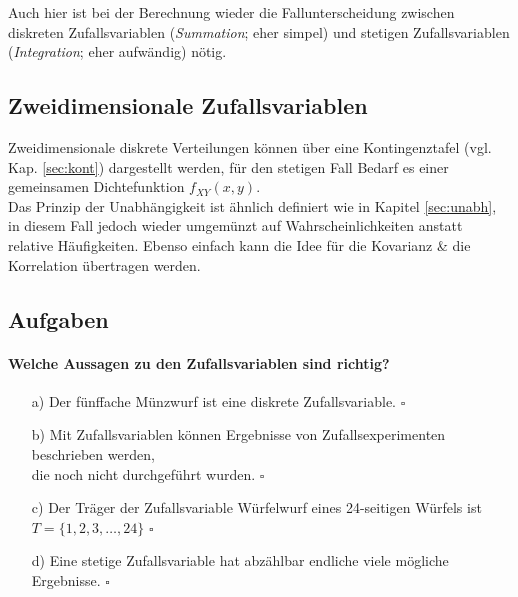 \documentclass[a4paper]{article}
\newcommand\dangersign[1][2ex]{%
  \renewcommand\stacktype{L}%
  \scaleto{\stackon[1.3pt]{\color{red}$\triangle$}{\tiny !}}{#1}%
}
\begin{document}
\noindent \dangersign[3ex] Auch hier ist bei der Berechnung wieder die Fallunterscheidung zwischen diskreten Zufallsvariablen (\textit{Summation}; eher simpel) und stetigen Zufallsvariablen (\textit{Integration}; eher aufwändig) nötig.

\subsection{Zweidimensionale Zufallsvariablen}\label{sec:2zv}

Zweidimensionale diskrete Verteilungen können über eine Kontingenztafel (vgl. Kap. \ref{sec:kont}) dargestellt werden, für den stetigen Fall Bedarf es einer gemeinsamen Dichtefunktion $f_{XY}(x,y)$.\\
Das Prinzip der Unabhängigkeit ist ähnlich definiert wie in Kapitel \ref{sec:unabh}, in diesem Fall jedoch wieder umgemünzt auf Wahrscheinlichkeiten anstatt relative Häufigkeiten. Ebenso einfach kann die Idee für die Kovarianz \& die Korrelation übertragen werden.

\clearpage

\subsection{Aufgaben}
\paragraph{Welche Aussagen zu den Zufallsvariablen sind richtig?}
\begin{itemize}
    \item[a)] Der fünffache Münzwurf ist eine diskrete Zufallsvariable. \hfill $\square$
    \item[b)] Mit Zufallsvariablen können Ergebnisse von Zufallsexperimenten beschrieben werden,\\ die noch nicht durchgeführt wurden. \hfill $\square$
    \item[c)] Der Träger der Zufallsvariable Würfelwurf eines 24-seitigen Würfels ist\\ $T = \{1, 2, 3, \hdots, 24\}$ \hfill $\square$
    \item[d)] Eine stetige Zufallsvariable hat abzählbar endliche viele mögliche Ergebnisse. \hfill $\square$
\end{itemize}

\clearpage

\end{document}
